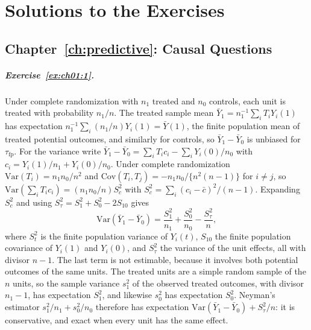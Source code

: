 \chapter{Solutions to the Exercises}\label{app:solutions}



\section*{Chapter~\ref{ch:predictive}: Causal Questions}

\paragraph{Exercise~\ref{ex:ch01:1}.} Under complete randomization with $n_1$ treated and $n_0$ controls, each unit is treated with probability $n_1/n$. The treated sample mean $\bar Y_1 = n_1^{-1}\sum_i T_i Y_i(1)$ has expectation $n_1^{-1}\sum_i (n_1/n)Y_i(1) = \bar Y(1)$, the finite population mean of treated potential outcomes, and similarly for controls, so $\bar Y_1 - \bar Y_0$ is unbiased for $\tau_{\mathrm{fp}}$. For the variance write $\bar Y_1 - \bar Y_0 = \sum_i T_ic_i - \sum_i Y_i(0)/n_0$ with $c_i = Y_i(1)/n_1 + Y_i(0)/n_0$. Under complete randomization $\mathrm{Var}(T_i) = n_1n_0/n^2$ and $\mathrm{Cov}(T_i, T_j) = -n_1n_0/\{n^2(n-1)\}$ for $i \neq j$, so $\mathrm{Var}(\sum_i T_ic_i) = (n_1n_0/n)S_c^2$ with $S_c^2 = \sum_i(c_i - \bar c)^2/(n-1)$. Expanding $S_c^2$ and using $S_\tau^2 = S_1^2 + S_0^2 - 2S_{10}$ gives
\[
\mathrm{Var}(\bar Y_1 - \bar Y_0) = \frac{S_1^2}{n_1} + \frac{S_0^2}{n_0} - \frac{S_{\tau}^2}{n},
\]
where $S_t^2$ is the finite population variance of $Y_i(t)$, $S_{10}$ the finite population covariance of $Y_i(1)$ and $Y_i(0)$, and $S_\tau^2$ the variance of the unit effects, all with divisor $n - 1$. The last term is not estimable, because it involves both potential outcomes of the same units. The treated units are a simple random sample of the $n$ units, so the sample variance $s_1^2$ of the observed treated outcomes, with divisor $n_1 - 1$, has expectation $S_1^2$, and likewise $s_0^2$ has expectation $S_0^2$. Neyman's estimator $s_1^2/n_1 + s_0^2/n_0$ therefore has expectation $\mathrm{Var}(\bar Y_1 - \bar Y_0) + S_\tau^2/n$: it is conservative, and exact when every unit has the same effect.

